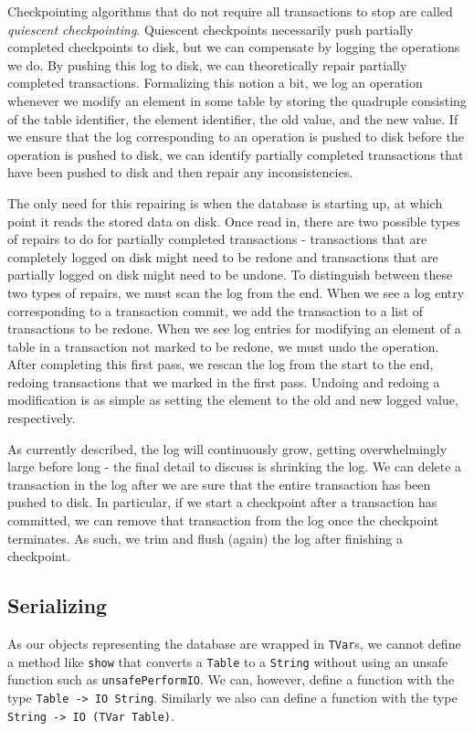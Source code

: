 \documentclass[10pt]{article}
\begin{document}
\begin{multicols}{2}
Checkpointing algorithms that do not require all transactions to stop are called \textit{quiescent checkpointing}. Quiescent checkpoints necessarily push partially completed checkpoints to disk, but we can compensate by logging the operations we do. By pushing this log to disk, we can theoretically repair partially completed transactions. Formalizing this notion a bit, we log an operation whenever we modify an element in some table by storing the quadruple consisting of the table identifier, the element identifier, the old value, and the new value. If we ensure that the log corresponding to an operation is pushed to disk before the operation is pushed to disk, we can identify partially completed transactions that have been pushed to disk and then repair any inconsistencies.

The only need for this repairing is when the database is starting up, at which point it reads the stored data on disk. Once read in, there are two possible types of repairs to do for partially completed transactions - transactions that are completely logged on disk might need to be redone and transactions that are partially logged on disk might need to be undone. To distinguish between these two types of repairs, we must scan the log from the end. When we see a log entry corresponding to a transaction commit, we add the transaction to a list of transactions to be redone. When we see log entries for modifying an element of a table in a transaction not marked to be redone, we must undo the operation. After completing this first pass, we rescan the log from the start to the end, redoing transactions that we marked in the first pass. Undoing and redoing a modification is as simple as setting the element to the old and new logged value, respectively.

As currently described, the log will continuously grow, getting overwhelmingly large before long - the final detail to discuss is shrinking the log. We can delete a transaction in the log after we are sure that the entire transaction has been pushed to disk. In particular, if we start a checkpoint after a transaction has committed, we can remove that transaction from the log once the checkpoint terminates. As such, we trim and flush (again) the log after finishing a checkpoint.


\subsection{Serializing}
As our objects representing the database are wrapped in \texttt{TVar}s, we cannot define a method like \texttt{show} that converts a \texttt{Table} to a \texttt{String} without using an unsafe function such as \texttt{unsafePerformIO}. We can, however, define a function with the type \texttt{Table -> IO String}. Similarly we also can define a function with the type \texttt{String -> IO (TVar Table)}.


\end{multicols}
\end{document}
